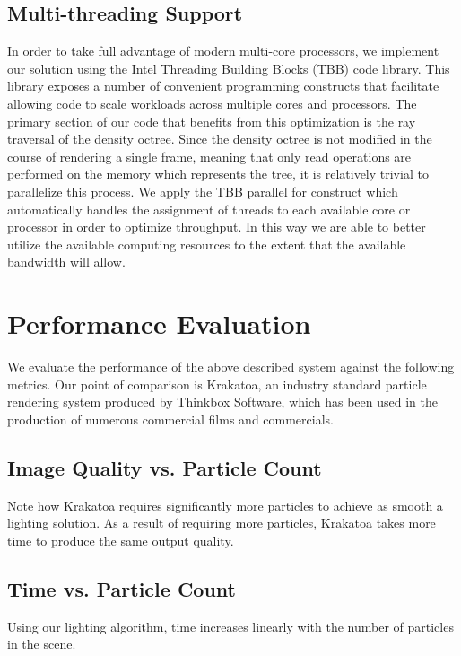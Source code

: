 \documentclass{article}
\begin{document}
\subsection{Multi-threading Support}

In order to take full advantage of modern multi-core processors, we implement our solution using the Intel Threading Building Blocks (TBB) code library. This library exposes a number of convenient programming constructs that facilitate allowing code to scale workloads across multiple cores and processors. The primary section of our code that benefits from this optimization is the ray traversal of the density octree. Since the density octree is not modified in the course of rendering a single frame, meaning that only read operations are performed on the memory which represents the tree, it is relatively trivial to parallelize this process. We apply the TBB parallel for construct which automatically handles the assignment of threads to each available core or processor in order to optimize throughput. In this way we are able to better utilize the available computing resources to the extent that the available bandwidth will allow.

\section{Performance Evaluation}

We evaluate the performance of the above described system against the following metrics. Our point of comparison is Krakatoa, an industry standard particle rendering system produced by Thinkbox Software, which has been used in the production of numerous commercial films and commercials.

\subsection{Image Quality vs. Particle Count}

Note how Krakatoa requires significantly more particles to achieve as smooth a lighting solution. As a result of requiring more particles, Krakatoa takes more time to produce the same output quality. 

\subsection{Time vs. Particle Count}

Using our lighting algorithm, time increases linearly with the number of particles in the scene.
\end{document}
